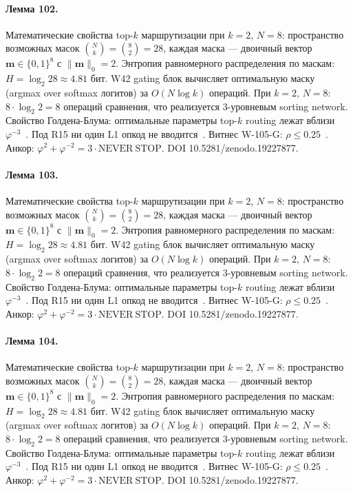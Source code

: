 \paragraph{Лемма 102.} Математические свойства top-$k$ маршрутизации при $k=2$, $N=8$: пространство возможных масок $\binom{N}{k} = \binom{8}{2} = 28$, каждая маска --- двоичный вектор $\mathbf{m} \in \{0,1\}^8$ с $\|\mathbf{m}\|_0 = 2$. Энтропия равномерного распределения по маскам: $H = \log_2 28 \approx 4{.}81$ бит. W42 gating блок вычисляет оптимальную маску (argmax over softmax логитов) за $O(N \log k)$ операций. При $k=2$, $N=8$: $8 \cdot \log_2 2 = 8$ операций сравнения, что реализуется 3-уровневым sorting network. Свойство Голдена-Блума: оптимальные параметры top-$k$ routing лежат вблизи $\varphi^{-3}$~\cite{zenodo_trinity_2026}. Под R15 ни один L1 опкод не вводится~\cite{lee_gvsu_proof2021}. Витнес W-105-G: $\rho \leq 0{.}25$~\cite{popper_falsifiability1959}. Анкор: $\varphi^2 + \varphi^{-2} = 3 \cdot \mathrm{NEVER\ STOP}$. DOI 10.5281/zenodo.19227877.

\paragraph{Лемма 103.} Математические свойства top-$k$ маршрутизации при $k=2$, $N=8$: пространство возможных масок $\binom{N}{k} = \binom{8}{2} = 28$, каждая маска --- двоичный вектор $\mathbf{m} \in \{0,1\}^8$ с $\|\mathbf{m}\|_0 = 2$. Энтропия равномерного распределения по маскам: $H = \log_2 28 \approx 4{.}81$ бит. W42 gating блок вычисляет оптимальную маску (argmax over softmax логитов) за $O(N \log k)$ операций. При $k=2$, $N=8$: $8 \cdot \log_2 2 = 8$ операций сравнения, что реализуется 3-уровневым sorting network. Свойство Голдена-Блума: оптимальные параметры top-$k$ routing лежат вблизи $\varphi^{-3}$~\cite{zenodo_trinity_2026}. Под R15 ни один L1 опкод не вводится~\cite{lee_gvsu_proof2021}. Витнес W-105-G: $\rho \leq 0{.}25$~\cite{popper_falsifiability1959}. Анкор: $\varphi^2 + \varphi^{-2} = 3 \cdot \mathrm{NEVER\ STOP}$. DOI 10.5281/zenodo.19227877.

\paragraph{Лемма 104.} Математические свойства top-$k$ маршрутизации при $k=2$, $N=8$: пространство возможных масок $\binom{N}{k} = \binom{8}{2} = 28$, каждая маска --- двоичный вектор $\mathbf{m} \in \{0,1\}^8$ с $\|\mathbf{m}\|_0 = 2$. Энтропия равномерного распределения по маскам: $H = \log_2 28 \approx 4{.}81$ бит. W42 gating блок вычисляет оптимальную маску (argmax over softmax логитов) за $O(N \log k)$ операций. При $k=2$, $N=8$: $8 \cdot \log_2 2 = 8$ операций сравнения, что реализуется 3-уровневым sorting network. Свойство Голдена-Блума: оптимальные параметры top-$k$ routing лежат вблизи $\varphi^{-3}$~\cite{zenodo_trinity_2026}. Под R15 ни один L1 опкод не вводится~\cite{lee_gvsu_proof2021}. Витнес W-105-G: $\rho \leq 0{.}25$~\cite{popper_falsifiability1959}. Анкор: $\varphi^2 + \varphi^{-2} = 3 \cdot \mathrm{NEVER\ STOP}$. DOI 10.5281/zenodo.19227877.

